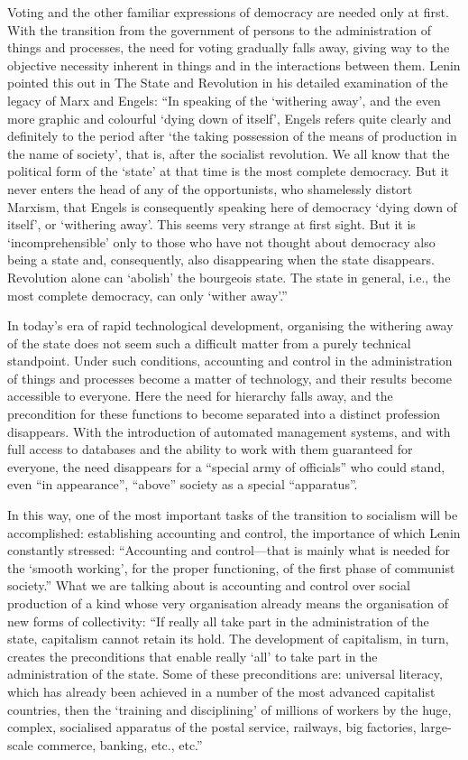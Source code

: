 \documentclass[../main]{subfiles}
\begin{document}
Voting and the other familiar expressions of democracy are needed only at first. With the transition from the government of persons to the administration of things and processes, the need for voting gradually falls away, giving way to the objective necessity inherent in things and in the interactions between them. Lenin pointed this out in The State and Revolution in his detailed examination of the legacy of Marx and Engels: “In speaking of the ‘withering away’, and the even more graphic and colourful ‘dying down of itself’, Engels refers quite clearly and definitely to the period after ‘the taking possession of the means of production in the name of society’, that is, after the socialist revolution. We all know that the political form of the ‘state’ at that time is the most complete democracy. But it never enters the head of any of the opportunists, who shamelessly distort Marxism, that Engels is consequently speaking here of democracy ‘dying down of itself’, or ‘withering away’. This seems very strange at first sight. But it is ‘incomprehensible’ only to those who have not thought about democracy also being a state and, consequently, also disappearing when the state disappears. Revolution alone can ‘abolish’ the bourgeois state. The state in general, i.e., the most complete democracy, can only ‘wither away’.”

In today’s era of rapid technological development, organising the withering away of the state does not seem such a difficult matter from a purely technical standpoint. Under such conditions, accounting and control in the administration of things and processes become a matter of technology, and their results become accessible to everyone. Here the need for hierarchy falls away, and the precondition for these functions to become separated into a distinct profession disappears. With the introduction of automated management systems, and with full access to databases and the ability to work with them guaranteed for everyone, the need disappears for a “special army of officials” who could stand, even “in appearance”, “above” society as a special “apparatus”.

In this way, one of the most important tasks of the transition to socialism will be accomplished: establishing accounting and control, the importance of which Lenin constantly stressed: “Accounting and control—that is mainly what is needed for the ‘smooth working’, for the proper functioning, of the first phase of communist society.” What we are talking about is accounting and control over social production of a kind whose very organisation already means the organisation of new forms of collectivity: “If really all take part in the administration of the state, capitalism cannot retain its hold. The development of capitalism, in turn, creates the preconditions that enable really ‘all’ to take part in the administration of the state. Some of these preconditions are: universal literacy, which has already been achieved in a number of the most advanced capitalist countries, then the ‘training and disciplining’ of millions of workers by the huge, complex, socialised apparatus of the postal service, railways, big factories, large-scale commerce, banking, etc., etc.”
\end{document}
